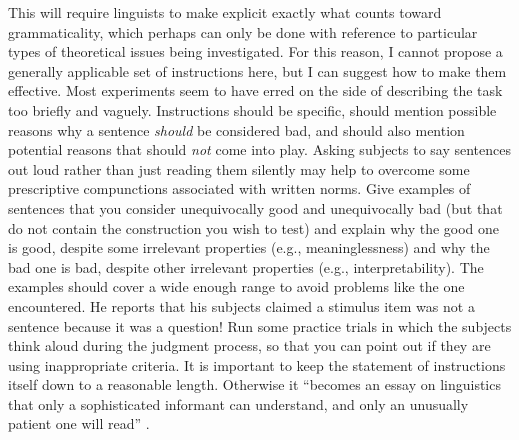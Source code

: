  This will require linguists to make explicit exactly what counts toward grammaticality, which perhaps can only be done with reference to particular types of theoretical issues being investigated. For this reason, I cannot propose a generally applicable set of instructions here, but I can suggest how to make them effective. Most experiments seem to have erred on the side of describing the task too briefly and vaguely. Instructions should be specific, should mention possible reasons why a sentence \textit{should} be considered bad, and should also mention potential reasons that should \textit{not} come into play. Asking subjects to say sentences out loud rather than just reading them silently may help to overcome some prescriptive compunctions associated with written norms. Give examples of sentences that you consider unequivocally good and unequivocally bad (but that do not contain the construction you wish to test) and explain why the good one is good, despite some irrelevant properties (e.g., meaninglessness) and why the bad one is bad, despite other irrelevant properties (e.g., interpretability). The examples should cover a wide enough range to avoid problems like the one \citet{Birdsong1989} encountered. He reports that his subjects claimed a stimulus item was not a sentence because it was a question! Run some practice trials in which the subjects think aloud during the judgment process, so that you can point out if they are using inappropriate criteria. It is important to keep the statement of instructions itself down to a reasonable length. Otherwise it ``becomes an essay on linguistics that only a sophisticated informant can understand, and only an unusually patient one will read'' \citep[296]{Carden1970a}.




